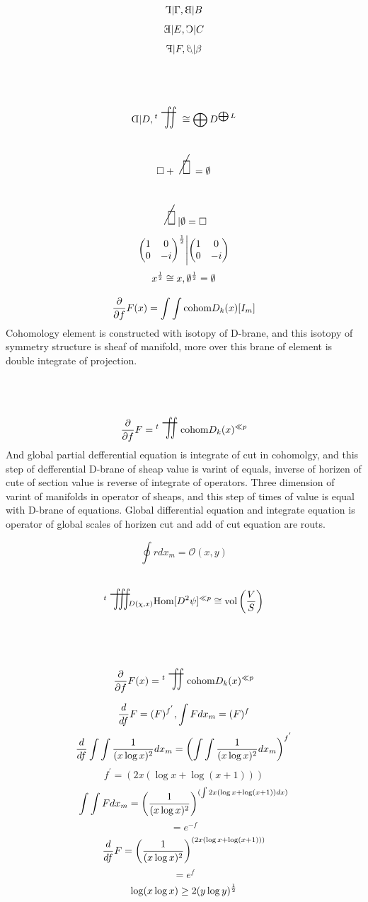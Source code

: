 \documentclass{jsarticle}
\begin{document}
 $$ \reflectbox{$\Gamma$} | \Gamma, \reflectbox{B} | B $$
 $$ \reflectbox{E} | E, \reflectbox{C} | C $$
 $$ \reflectbox{F} | F, \reflectbox{$\beta$} | \beta $$
 $$ \reflectbox{D} | D, {}^{t}\scalebox{1}[2]{\variint} \cong 
 \bigoplus D^{\bigoplus L} $$
 $$ \square +  \scalebox{1}[2]{\alearletter} = \emptyset $$
 $$  \scalebox{1}[2]{\alearletter} | \emptyset = \square $$
 $$ {\begin{pmatrix} 1 & 0 \\
 0 & -i \end{pmatrix}}^{1 \over 2} \Biggl| {\begin{pmatrix} 1 & 0 \\
 0 & -i \end{pmatrix}}$$
 $$ x^{1 \over 2} \cong x, \emptyset^{1 \over 2} = \emptyset$$
 
  $$ {\partial \over \partial f}F(x) = \int \int \text{cohom}D_k(x)[I_m]  $$
 Cohomology element is constructed with isotopy of D-brane,
 and this isotopy of symmetry structure is sheaf of manifold,
 more over this brane of element is double integrate of projection.
 $$ {\partial \over \partial f}F = {{}^t \scalebox{1}[2]{\variint}}
 \text{cohom}D_k(x)^{\ll p} $$
 And global partial defferential equation is integrate of cut in cohomolgy,
 and this step of defferential D-brane of sheap value is varint of equals,
 inverse of horizen of cute of section value is reverse of integrate of 
 operators. Three dimension of varint of manifolds in operator of sheaps,
 and this step of times of value is equal with D-brane of equations.
 Global differential equation and integrate equation is operator of 
 global scales of horizen cut and add of cut equation are routs.

 $$ \oint r dx_m = \mathcal{O}(x,y) $$

 $$ {{}^t \scalebox{1}[2]{\variiint}}_{{D(\chi,x)}} 
 \text{Hom}[D^2 \psi]^{\ll p} \cong 
 \text{vol}\left({V \over S}\right) $$

 $$ {\partial \over \partial f}F(x) = {{}^t \scalebox{1}[2]{\variint}} 
 \text{cohom}D_k(x)^{\ll p} $$

 $$ {d \over df}F = (F)^{f^{'}}, \int F dx_m = (F)^{f}  $$
 $$ {d \over df}\int \int{1 \over (x \log x)^2}dx_m =
 \left(\int \int{1 \over (x \log x)^2}dx_m \right)^{f^{'}}  $$
 $$ f^{'} = (2x (\log x + \log (x + 1))) $$
  $$  \int \int F dx_m = \left({1 \over (x \log x)^2}\right)^{
	  (\int 2x (\log x + \log (x + 1))dx)} $$ 
   $$= e^{-f} $$
  $$ {d \over df}F = \left({1 \over (x \log x)^2}\right)^{
	  (2x (\log x + \log (x + 1))) } $$  
  $$= e^{f} $$
  $$ \log (x \log x) \ge 2(y \log y)^{1 \over 2} $$
\end{document}
